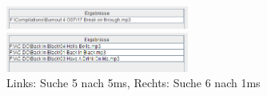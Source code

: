 \documentclass[12pt,a4paper,ngerman]{report}
\begin{document}
\begin{figure}[h!]
\centering
	\begin{minipage}[b]{7cm}
	\includegraphics[width=6cm]{img/search5_stanAn_5MS.png}
	\end{minipage}
	\begin{minipage}[b]{7cm}
	\includegraphics[width=6cm]{img/search6_stanAn_1MS.png}
	\end{minipage}
\caption{Links: Suche 5 nach 5ms, Rechts: Suche 6 nach 1ms\protect\footnotemark}
\end{figure}
\end{document}
